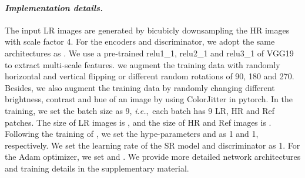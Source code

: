 \documentclass[runningheads]{llncs}
\def\ie{\mbox{\textit{i.e.}, }}
\begin{document}
\paragraph{\textbf{\emph{Implementation details.}}}
The input LR images are generated by bicubicly downsampling the HR images with scale factor 4.
For the encoders and discriminator, we adopt the same architectures as \cite{jiang2021robust}.
We use a pre-trained relu1\_1, relu2\_1 and relu3\_1 of VGG19 to extract multi-scale features.
we augment the training data with randomly horizontal and vertical flipping or different random rotations of 90, 180 and 270.
Besides, we also augment the training data by randomly changing different brightness, contrast and hue of an image by using ColorJitter in pytorch.
In the training, we set the batch size as 9, \ie each batch has 9 LR, HR and Ref patches.
The size of LR images is , and the size of HR and Ref images is .
Following the training of \cite{jiang2021robust}, we set the hype-parameters  and  as 1 and 1, respectively.
We set the learning rate of the SR model and discriminator as 1.
For the Adam optimizer, we set  and .
We provide more detailed network architectures and training details in the supplementary material.
\end{document}
